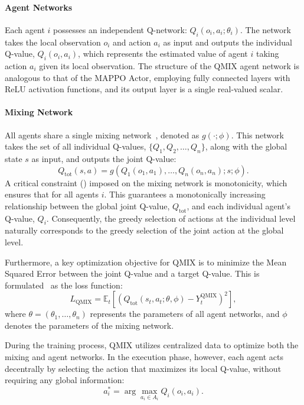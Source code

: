 \paragraph{Agent Networks}
Each agent $i$ possesses an independent Q-network:
$
Q_i(o_i, a_i; \theta_i).
$
The network takes the local observation $o_i$ and action $a_i$ as input and outputs the individual Q-value, $Q_i(o_i, a_i)$, which represents the estimated value of agent $i$ taking action $a_i$ given its local observation. The structure of the QMIX agent network is analogous to that of the MAPPO Actor, employing fully connected layers with ReLU activation functions, and its output layer is a single real-valued scalar.

\paragraph{Mixing Network}
All agents share a single mixing network~\cite{rashidQMIXMonotonicValue2018}, denoted as $g(\cdot; \phi)$. This network takes the set of all individual Q-values, $\{Q_1, Q_2, \dots, Q_n\}$, along with the global state $s$ as input, and outputs the joint Q-value:
\begin{equation}
    Q_{\text{tot}}(s, a) = g(Q_1(o_1, a_1), \dots, Q_n(o_n, a_n); s; \phi).
\end{equation}
A critical constraint () imposed on the mixing network is monotonicity, which ensures that for all agents $i$.
This guarantees a monotonically increasing relationship between the global joint Q-value, $Q_{\text{tot}}$, and each individual agent's Q-value, $Q_i$. Consequently, the greedy selection of actions at the individual level naturally corresponds to the greedy selection of the joint action at the global level.

Furthermore, a key optimization objective for QMIX is to minimize the Mean Squared Error between the joint Q-value and a target Q-value. This is formulated~\cite{rashidQMIXMonotonicValue2018} as the loss function:
\begin{equation}
    L_{\text{QMIX}} = \mathbb{E}_t\left[ (Q_{\text{tot}}(s_t, a_t; \theta, \phi) - Y_t^{\text{QMIX}})^2 \right],
\end{equation}
where $\theta = (\theta_1, \dots, \theta_n)$ represents the parameters of all agent networks, and $\phi$ denotes the parameters of the mixing network.

During the training process, QMIX utilizes centralized data to optimize both the mixing and agent networks. In the execution phase, however, each agent acts decentrally by selecting the action that maximizes its local Q-value, without requiring any global information:
\begin{equation}
    a_i^* = \arg\max_{a_i \in A_i} Q_i(o_i, a_i).
\end{equation}

